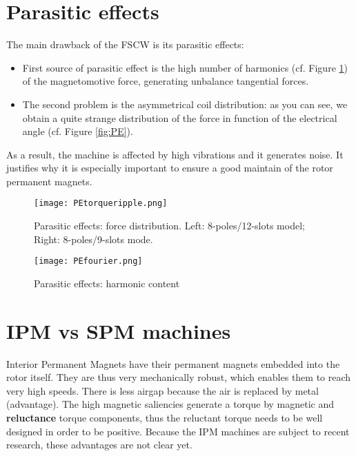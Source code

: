 \section{Parasitic effects}
The main drawback of the FSCW is its parasitic effects:
\begin{itemize}
    \item First source of parasitic effect is the high number of harmonics (cf. Figure \ref{fig:PEfourier}) of the magnetomotive force, generating unbalance tangential forces.
    \item The second problem is the asymmetrical coil distribution: as you can see, we obtain a quite strange distribution of the force in function of the electrical angle (cf. Figure \ref{fig:PE}).
\end{itemize}
As a result, the machine is affected by high vibrations and it generates noise.
It justifies why it is especially important to ensure a good maintain of the rotor permanent magnets.
\begin{figure}[H]
    \begin{minipage}{0.49 \textwidth}
        \centering
        \texttt{[image: PEtorqueripple.png]}
        \caption{Parasitic effects: force distribution. Left: 8-poles/12-slots model; Right: 8-poles/9-slots mode.}
        \label{fig:PE}
    \end{minipage}
    \begin{minipage}{0.49 \textwidth}
        \centering
        \texttt{[image: PEfourier.png]}
        \caption{Parasitic effects: harmonic content}
        \label{fig:PEfourier}
    \end{minipage}
\end{figure}



\section{IPM vs SPM machines}

Interior Permanent Magnets have their permanent magnets embedded into
the rotor itself. They are thus very mechanically robust, which enables them to reach very high speeds. There is less airgap because the air is replaced by metal (advantage).
The high magnetic saliencies generate a torque by magnetic and \textbf{reluctance}
torque components, thus the reluctant torque needs to be well designed in order to be positive.
Because the IPM machines are subject to recent research, these advantages are not clear yet.

